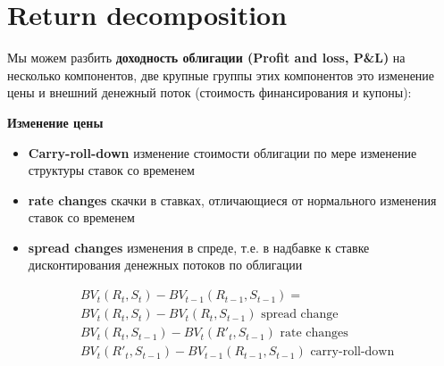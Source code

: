 \documentclass{article}
\begin{document}
\section{Return decomposition}
Мы можем разбить \textbf{доходность облигации (Profit and loss, P&L)} на несколько компонентов, две крупные группы этих компонентов это изменение цены и внешний денежный поток (стоимость финансирования и купоны):

\textbf{Изменение цены}
\begin{itemize}
     \item \textbf{Carry-roll-down} изменение стоимости облигации по мере изменение структуры ставок со временем
     \item \textbf{rate changes} скачки в ставках, отличающиеся от нормального изменения ставок со временем
     \item \textbf{spread changes} изменения в спреде, т.е. в надбавке к ставке дисконтирования денежных потоков по облигации
 \end{itemize}
\begin{align*}
    & BV_{t}(R_{t}, S_{t}) - BV_{t-1}(R_{t-1}, S_{t-1}) = \\
    & BV_{t}(R_{t}, S_{t}) - BV_{t}(R_{t}, S_{t-1}) \text{ spread change}\\
    & BV_{t}(R_{t}, S_{t-1}) - BV_{t}(R'_{t}, S_{t-1}) \text{ rate changes}\\
    & BV_{t}(R'_{t}, S_{t-1}) - BV_{t-1}(R_{t-1}, S_{t-1}) \text{ carry-roll-down}\\
\end{align*}
\end{document}
